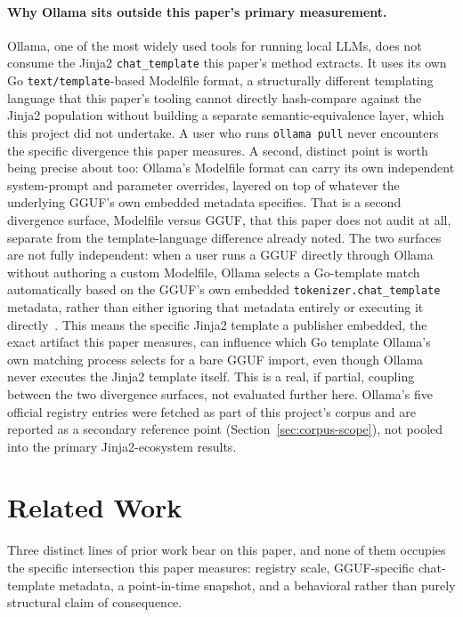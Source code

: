 \documentclass[letterpaper,twocolumn,10pt]{article}
\begin{document}
\paragraph{Why Ollama sits outside this paper's primary measurement.} Ollama, one of the most widely used tools for running local LLMs, does not consume the Jinja2 \texttt{chat\_template} this paper's method extracts. It uses its own Go \texttt{text/template}-based Modelfile format, a structurally different templating language that this paper's tooling cannot directly hash-compare against the Jinja2 population without building a separate semantic-equivalence layer, which this project did not undertake. A user who runs \texttt{ollama pull} never encounters the specific divergence this paper measures. A second, distinct point is worth being precise about too: Ollama's Modelfile format can carry its own independent system-prompt and parameter overrides, layered on top of whatever the underlying GGUF's own embedded metadata specifies. That is a second divergence surface, Modelfile versus GGUF, that this paper does not audit at all, separate from the template-language difference already noted. The two surfaces are not fully independent: when a user runs a GGUF directly through Ollama without authoring a custom Modelfile, Ollama selects a Go-template match automatically based on the GGUF's own embedded \texttt{tokenizer.chat\_template} metadata, rather than either ignoring that metadata entirely or executing it directly~\cite{huggingface2026ollama}. This means the specific Jinja2 template a publisher embedded, the exact artifact this paper measures, can influence which Go template Ollama's own matching process selects for a bare GGUF import, even though Ollama never executes the Jinja2 template itself. This is a real, if partial, coupling between the two divergence surfaces, not evaluated further here. Ollama's five official registry entries were fetched as part of this project's corpus and are reported as a secondary reference point (Section~\ref{sec:corpus-scope}), not pooled into the primary Jinja2-ecosystem results.

\section{Related Work}
\label{sec:related-work}

Three distinct lines of prior work bear on this paper, and none of them occupies the specific intersection this paper measures: registry scale, GGUF-specific chat-template metadata, a point-in-time snapshot, and a behavioral rather than purely structural claim of consequence.
\end{document}
